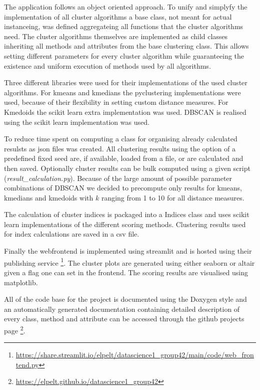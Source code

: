 The application follows an object oriented approach. To unify and simplyfy the implementation of all cluster algorithms a base class, not meant for actual instanceing, was defined aggregateing all functions that the cluster algorithms need.
The cluster algorithms themselves are implemented as child classes inheriting all methods and attributes from the base clustering class. This allows setting different parameters for every cluster algorithm while guaranteeing the existence and uniform execution of methods used by all algorithms.

Three different libraries were used for their implementations of the used cluster algorithms. 
For kmeans and kmedians the pyclustering \cite{Novikov2019} implementations were used, because of their flexibility in setting custom distance measures. For Kmedoids the scikit learn extra \cite{scikit-learn-extra} implementation was used.
DBSCAN is realised using the scikit learn implementation \cite{scikitlearn} was used.

To reduce time spent on computing a class for organising already calculated resulsts as json files was created. All clustering results using the option of a predefined fixed seed are, if available, loaded from a file, or are calculated and then saved. Optionally cluster results can be bulk computed using a given script (\textit{result\_calculation.py}). Because of the large amount of possible parameter combinations of DBSCAN we decided to precompute only results for kmeans, kmedians and kmedoids with $k$ ranging from 1 to 10 for all distance measures.

The calculation of cluster indices is packaged into a Indices class and uses scikit learn implementations of the different scoring methods. Clustering results used for index calculations are saved in a csv file.

Finally the webfrontend is implemented using streamlit and is hosted using their publishing service \footnote{\url{https://share.streamlit.io/elpelt/datascience1_group42/main/code/web_frontend.py}}. The cluster plots are generated using either seaborn or altair given a flag one can set in the frontend. The scoring results are visualised using matplotlib.

All of the code base for the project is documented using the Doxygen style and an automatically generated documentation containing detailed description of every class, method and attribute can be accessed through the github projects page \footnote{\url{https://elpelt.github.io/datascience1_group42}}.